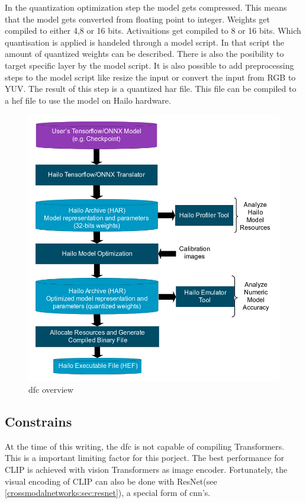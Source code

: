 In the quantization optimization step the model gets compressed.
This means that the model gets converted from floating point to integer.
Weights get compiled to either 4,8 or 16 bits.
Activaitions get compiled to 8 or 16 bits.
Which quantisation is applied is handeled through a model script.
In that script the amount of quantized weights can be described.
There is also the posibility to target specific layer by the model script.
It is also possible to add preprocessing steps to the model script like resize the input or convert the input from RGB to YUV.
The result of this step is a quantized \acrshort{har} file.
This file can be compiled to a \acrshort{hef} file to use the model on Hailo hardware.

\begin{figure}[!h]
    \centering
    \includegraphics[width=\textwidth]{Images/Hardware/model_build_overview_with_onnx_and_hef_w_har.png}
    \caption{\Acrlong{dfc} overview \cite{hailo_dataflow_compiler}}
    \label{fig:hardware:dfcoverview}
\end{figure}

\subsection{Constrains}
At the time of this writing, the \acrshort{dfc} is not capable of compiling Transformers.
This is a important limiting factor for this porject.
The best performance for CLIP is achieved with vision Transformers as image encoder.
Fortunately, the visual encoding of CLIP can also be done with ResNet(see \cref{crossmodalnetworks:sec:resnet}), a special form of \Acrshort{cnn}'s.

